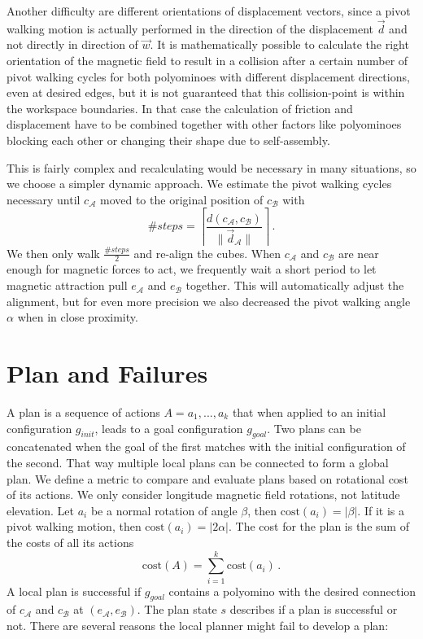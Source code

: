 Another difficulty are different orientations of displacement vectors, since a pivot walking motion is actually performed in the direction of the displacement $\vec{d}$ and not directly in direction of $\vec{w}$.
It is mathematically possible to calculate the right orientation of the magnetic field to result in a collision after a certain number of pivot walking cycles for both polyominoes with different displacement directions, even at desired edges, but it is not guaranteed that this collision-point is within the workspace boundaries.
In that case the calculation of friction and displacement have to be combined together with other factors like polyominoes blocking each other or changing their shape due to self-assembly.

This is fairly complex and recalculating would be necessary in many situations, so we choose a simpler dynamic approach.
We estimate the pivot walking cycles necessary until $c_\mathcal{A}$ moved to the original position of $c_\mathcal{B}$ with
\begin{equation}
\#\textit{steps} = \left\lceil \frac{d(c_\mathcal{A}, c_\mathcal{B})}{\lVert \vec{d}_\mathcal{A} \rVert} \right\rceil \,.
\end{equation}
We then only walk $\frac{\#\textit{steps}}{2}$ and re-align the cubes.
When $c_\mathcal{A}$ and $c_\mathcal{B}$ are near enough for magnetic forces to act, we frequently wait a short period to let magnetic attraction pull $e_\mathcal{A}$ and $e_\mathcal{B}$ together.
This will automatically adjust the alignment, but for even more precision we also decreased the pivot walking angle $\alpha$ when in close proximity.

\section{Plan and Failures}
\label{sec:plan}

A plan is a sequence of actions $A = a_1, ... , a_k$ that when applied to an initial configuration $g_\textit{init}$, leads to a goal configuration $g_\textit{goal}$.
Two plans can be concatenated when the goal of the first matches with the initial configuration of the second.
That way multiple local plans can be connected to form a global plan.
We define a metric to compare and evaluate plans based on rotational cost of its actions.
We only consider longitude magnetic field rotations, not latitude elevation.
Let $a_i$ be a normal rotation of angle $\beta$, then $\text{cost}(a_i) = |\beta|$.
If it is a pivot walking motion, then $\text{cost}(a_i) = |2\alpha|$.
The cost for the plan is the sum of the costs of all its actions
\begin{equation}
\text{cost}(A) = \sum_{i=1}^{k} \text{cost}(a_i) \,.
\end{equation}
A local plan is successful if $g_\textit{goal}$ contains a polyomino with the desired connection of $c_\mathcal{A}$ and $c_\mathcal{B}$ at $(e_\mathcal{A}, e_\mathcal{B})$.
The plan state $s$ describes if a plan is successful or not.
There are several reasons the local planner might fail to develop a plan:

